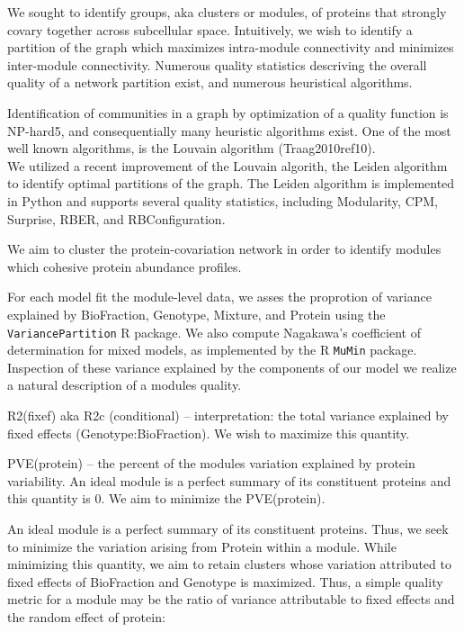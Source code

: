 \documentclass[11pt]{elife}\usepackage[]{graphicx}\usepackage[]{color}
\begin{document}

We sought to identify groups, aka clusters or modules, of proteins that strongly
covary together across subcellular space. Intuitively, we wish to identify a
partition of the graph which maximizes intra-module connectivity and minimizes 
inter-module connectivity. Numerous quality statistics descriving the overall
quality of a network partition exist, and numerous heuristical algorithms.

Identification of communities in a graph by optimization of a quality function
is NP-hard5, and consequentially many heuristic algorithms exist.
One of the most well known algorithms, is the Louvain algorithm
(Traag2010ref10).  \\

We utilized a recent improvement of the Louvain algorith, the 
Leiden algorithm to identify optimal partitions of the graph. 
The Leiden algorithm is implemented in Python and supports several quality
statistics, including Modularity, CPM, Surprise, RBER, and RBConfiguration.

We aim to cluster the protein-covariation network in order to identify modules
which cohesive protein abundance profiles.

For each model fit the module-level data, we asses the proprotion of variance
explained by BioFraction, Genotype, Mixture, and Protein using the
\texttt{VariancePartition} R package. We also compute Nagakawa's coefficient of
determination for mixed models, as implemented by the R \texttt{MuMin} package. 
Inspection of these variance explained by the components of our model we 
realize a natural description of a modules quality. 

R2(fixef) aka R2c (conditional) -- interpretation: the total variance explained
by fixed effects (Genotype:BioFraction). We wish to maximize this quantity.

PVE(protein) -- the percent of the modules variation explained by protein
variability. An ideal module is a perfect summary of its constituent proteins
and this quantity is 0. We aim to minimize the PVE(protein).

An ideal module is a perfect summary of its constituent proteins. Thus, we seek
to minimize the variation arising from Protein within a module. While minimizing
this quantity, we aim to retain clusters whose variation attributed to fixed
effects of BioFraction and Genotype is maximized. Thus, a simple quality metric
for a module may be the ratio of variance attributable to fixed effects and the
random effect of protein:
\end{document}
